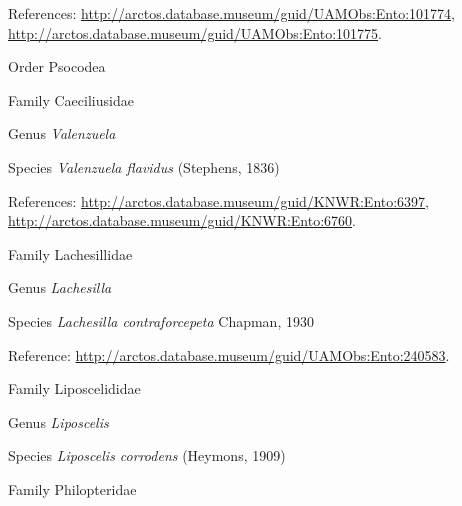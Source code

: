 \documentclass[9pt, article]{memoir}
\begin{document}
\begin{multicols}{2}
\vspace{6pt}References: 
\url{http://arctos.database.museum/guid/UAMObs:Ento:101774}, 
\url{http://arctos.database.museum/guid/UAMObs:Ento:101775}.

\vspace{6pt}\noindent\hspace{18pt}Order Psocodea


\vspace{6pt}\noindent\hspace{24pt}Family Caeciliusidae


\vspace{6pt}\noindent\hspace{30pt}Genus \textit{Valenzuela}


\vspace{6pt}\noindent\hspace{36pt}Species \textit{Valenzuela flavidus} (Stephens, 1836)


\vspace{6pt}References: 
\url{http://arctos.database.museum/guid/KNWR:Ento:6397}, 
\url{http://arctos.database.museum/guid/KNWR:Ento:6760}.

\vspace{6pt}\noindent\hspace{24pt}Family Lachesillidae


\vspace{6pt}\noindent\hspace{30pt}Genus \textit{Lachesilla}


\vspace{6pt}\noindent\hspace{36pt}Species \textit{Lachesilla contraforcepeta} Chapman, 1930


\vspace{6pt}Reference: 
\url{http://arctos.database.museum/guid/UAMObs:Ento:240583}.

\vspace{6pt}\noindent\hspace{24pt}Family Liposcelididae


\vspace{6pt}\noindent\hspace{30pt}Genus \textit{Liposcelis}


\vspace{6pt}\noindent\hspace{36pt}Species \textit{Liposcelis corrodens} (Heymons, 1909)


\vspace{6pt}\noindent\hspace{24pt}Family Philopteridae



\end{multicols}
\end{document}
